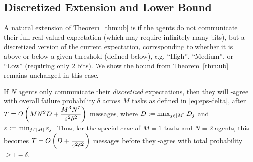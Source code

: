 \subsection{Discretized Extension and Lower Bound}
\label{ss:results-lower}
A natural extension of Theorem~\ref{thm:ub} is if the agents do not communicate their full real-valued expectation (which may require infinitely many bits), but a discretized version of the current expectation, corresponding to whether it is above or below a given threshold (defined below), e.g. ``High'', ``Medium'', or ``Low'' (requiring only 2 bits).
We show the bound from Theorem~\ref{thm:ub} remains unchanged in this case.
\begin{proposition}\label{prop:disc}
If $N$ agents only communicate their \emph{discretized} expectations, then they will \agree-agree with overall failure probability $\delta$ across $M$ tasks as defined in \eqref{eq:eps-delta}, after $T = O\left(MN^2 D + \dfrac{M^3N^7}{\varepsilon^2\delta^2}\right)$ messages, where $D := \max_{j \in [M]} D_j$ and $\varepsilon := \min_{j \in [M]}\varepsilon_j$.
Thus, for the special case of $M=1$ tasks and $N=2$ agents, this becomes $T = O\left(D + \dfrac{1}{\varepsilon^2\delta^2}\right)$ messages before they \agree-agree with total probability $\ge 1-\delta$.
\end{proposition}
